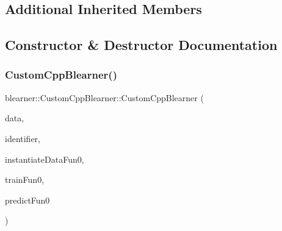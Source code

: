 \subsection*{Additional Inherited Members}


\subsection{Constructor \& Destructor Documentation}
\mbox{\label{classblearner_1_1_custom_cpp_blearner_a053eccfff8223ab0358b7f00ed02d263}} 
\subsubsection{\texorpdfstring{Custom\+Cpp\+Blearner()}{CustomCppBlearner()}}
{\footnotesize\ttfamily blearner\+::\+Custom\+Cpp\+Blearner\+::\+Custom\+Cpp\+Blearner (\begin{DoxyParamCaption}\item[{\mbox{\hyperlink{classdata_1_1_data}{data\+::\+Data}} $\ast$}]{data,  }\item[{const std\+::string \&}]{identifier,  }\item[{S\+E\+XP}]{instantiate\+Data\+Fun0,  }\item[{S\+E\+XP}]{train\+Fun0,  }\item[{S\+E\+XP}]{predict\+Fun0 }\end{DoxyParamCaption})}

